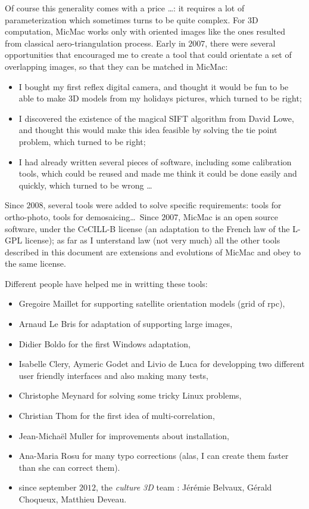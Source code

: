 Of course this generality comes with a price \dots : it requires a lot of parameterization
which sometimes turns to be quite complex.  For 3D computation, MicMac works only
with oriented images like the ones resulted from classical aero-triangulation process. Early
in $2007$, there were several opportunities that encouraged me to create a
tool that could orientate a set of overlapping images, so that they can be matched in
MicMac:

\begin{itemize}
   \item  I bought my first reflex digital camera, and thought it would be fun
          to be able to make 3D models from my holidays pictures, which turned to be right;

   \item  I discovered the existence of the magical SIFT algorithm from David Lowe, and thought this
          would make this idea feasible by solving the tie point problem, which turned to be right;

   \item  I had already written several pieces of software, including some calibration tools, which
          could be reused and made me think it could be done easily and quickly, which turned to be wrong \dots
\end{itemize}

Since $2008$, several tools were added to solve specific requirements: tools for ortho-photo, tools
for demosaicing\dots \  Since $2007$,  MicMac is an open source software, under the CeCILL-B license
(an adaptation to the French law of the L-GPL license); as far as I unterstand law (not very much) all
the other tools described in this document are extensions and evolutions of MicMac and obey to
the same license.

Different people have helped me in writting these tools:

\begin{itemize}
   \item Gregoire Maillet for supporting satellite orientation models (grid of rpc),
   \item Arnaud Le Bris for adaptation of \SiftPP supporting large images,
   \item Didier Boldo for the first Windows adaptation,
   \item Isabelle Clery, Aymeric Godet and Livio de Luca for  developping two different user friendly interfaces and
         also making many tests,
   \item Christophe Meynard for solving some tricky Linux problems,
   \item Christian Thom for the first idea of multi-correlation,
   \item Jean-Micha\"el Muller for improvements about installation,
   \item Ana-Maria Rosu for many typo corrections (alas, I can create them faster than she can correct them).
   \item since september $2012$, the \emph{culture 3D} team : J\'er\'emie Belvaux, G\'erald Choqueux,
         Matthieu Deveau.
\end{itemize}

